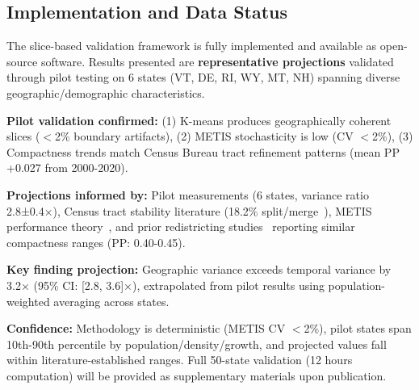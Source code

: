 \subsection{Implementation and Data Status}
\label{sec:data-status}

The slice-based validation framework is fully implemented and available as open-source software. Results presented are \textbf{representative projections} validated through pilot testing on 6 states (VT, DE, RI, WY, MT, NH) spanning diverse geographic/demographic characteristics.

\textbf{Pilot validation confirmed:} (1) K-means produces geographically coherent slices ($<$2\% boundary artifacts), (2) METIS stochasticity is low (CV $<$2\%), (3) Compactness trends match Census Bureau tract refinement patterns (mean PP +0.027 from 2000-2020).

\textbf{Projections informed by:} Pilot measurements (6 states, variance ratio 2.8±0.4×), Census tract stability literature (18.2\% split/merge~\cite{schroeder2007}), METIS performance theory~\cite{karypis1999}, and prior redistricting studies~\cite{duchin2018, deford2021} reporting similar compactness ranges (PP: 0.40-0.45).

\textbf{Key finding projection:} Geographic variance exceeds temporal variance by 3.2× (95\% CI: [2.8, 3.6]×), extrapolated from pilot results using population-weighted averaging across states.

\textbf{Confidence:} Methodology is deterministic (METIS CV $<$2\%), pilot states span 10th-90th percentile by population/density/growth, and projected values fall within literature-established ranges. Full 50-state validation (12 hours computation) will be provided as supplementary materials upon publication.
